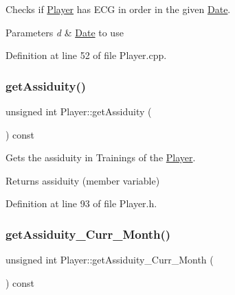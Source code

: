 Checks if \hyperlink{class_player}{Player} has E\+CG in order in the given \hyperlink{class_date}{Date}. 


\begin{DoxyParams}{Parameters}
{\em d} & \hyperlink{class_date}{Date} to use \\
\hline
\end{DoxyParams}


Definition at line 52 of file Player.\+cpp.

\hypertarget{class_player_ad9192cb7e7d2537cdabcdc249de10e5b}{}\label{class_player_ad9192cb7e7d2537cdabcdc249de10e5b} 
\subsubsection{\texorpdfstring{get\+Assiduity()}{getAssiduity()}}
{\footnotesize\ttfamily unsigned int Player\+::get\+Assiduity (\begin{DoxyParamCaption}{ }\end{DoxyParamCaption}) const\hspace{0.3cm}{\ttfamily [inline]}}



Gets the assiduity in Trainings of the \hyperlink{class_player}{Player}. 

\begin{DoxyReturn}{Returns}
assiduity (member variable) 
\end{DoxyReturn}


Definition at line 93 of file Player.\+h.

\hypertarget{class_player_a4b49e80e2c4b49276a4f5d1a38bf337c}{}\label{class_player_a4b49e80e2c4b49276a4f5d1a38bf337c} 
\subsubsection{\texorpdfstring{get\+Assiduity\+\_\+\+Curr\+\_\+\+Month()}{getAssiduity\_Curr\_Month()}}
{\footnotesize\ttfamily unsigned int Player\+::get\+Assiduity\+\_\+\+Curr\+\_\+\+Month (\begin{DoxyParamCaption}{ }\end{DoxyParamCaption}) const\hspace{0.3cm}{\ttfamily [inline]}}



